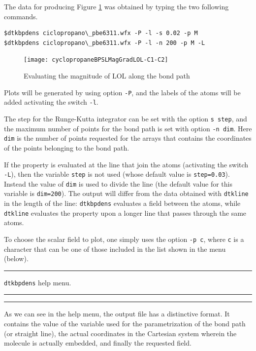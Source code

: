 The data for producing Figure \ref{fig:dtkbpdensusex} was obtained by typing the two following commands.
\begin{lstlisting}
$dtkbpdens ciclopropano\_pbe6311.wfx -P -l -s 0.02 -p M
$dtkbpdens ciclopropano\_pbe6311.wfx -P -l -n 200 -p M -L
\end{lstlisting}
%
\begin{figure}[ht!]
\centering
\texttt{[image: cyclopropaneBPSLMagGradLOL-C1-C2]}
\caption{Evaluating the magnitude of LOL along the bond path}\label{fig:dtkbpdensusex}
\end{figure}
%

Plots will be generated by using option \texttt{-P}, and the labels of the atoms will be added activating the switch \texttt{-l}.

The step for the Runge-Kutta integrator can be set with the option \texttt{s step}, and the maximum number of points for the bond path is set with option \texttt{-n dim}. Here \texttt{dim} is the number of points requested for the arrays that contains the coordinates of the points belonging to the bond path.

If the property is evaluated at the line that join the atoms (activating the switch
\texttt{-L}), then the variable \texttt{step} is not used (whose default value is \texttt{step=0.03}).
Instead the value of \texttt{dim} is used to divide the line (the default value
for this variable is \texttt{dim=200}). The output will differ from the data obtained
with \texttt{dtkline} in the length of the line: \texttt{dtkbpdens} evaluates a field
between the atoms, while \texttt{dtkline} evaluates the property upon a longer line
that passes through the same atoms.

To choose the scalar field to plot, one simply uses the option \texttt{-p c}, where
\texttt{c} is a character that can be one of those included in the list shown in the menu (below).

\rule{\textwidth}{1pt}
{\center\texttt{dtkbpdens} help menu.\\}
\rule{\textwidth}{1pt}
\begin{footnotesize}
\end{footnotesize}
\rule{\textwidth}{1pt}

As we can see in the help menu, the output file has a distinctive format. It contains the value of the variable used for the parametrization of the bond path (or straight line), the actual coordinates in the Cartesian system wherein the molecule is actually embedded, and finally the requested field.

